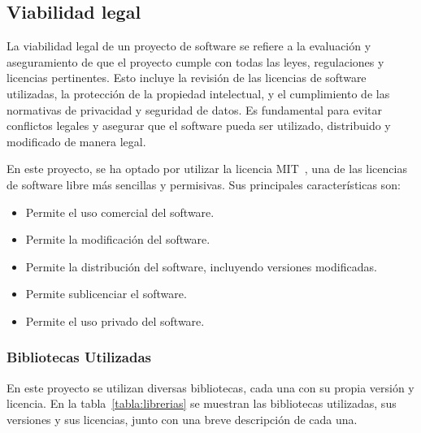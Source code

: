 \subsection{Viabilidad legal}
La viabilidad legal de un proyecto de software se refiere a la evaluación y aseguramiento de que el proyecto cumple con todas las leyes, regulaciones y licencias pertinentes. Esto incluye la revisión de las licencias de software utilizadas, la protección de la propiedad intelectual, y el cumplimiento de las normativas de privacidad y seguridad de datos. Es fundamental para evitar conflictos legales y asegurar que el software pueda ser utilizado, distribuido y modificado de manera legal.

En este proyecto, se ha optado por utilizar la licencia MIT~\cite{eswiki:MIT}, una de las licencias de software libre más sencillas y permisivas. Sus principales características son:

\begin{itemize}
    \item Permite el uso comercial del software.
    \item Permite la modificación del software.
    \item Permite la distribución del software, incluyendo versiones modificadas.
    \item Permite sublicenciar el software.
    \item Permite el uso privado del software.
\end{itemize}

\subsubsection{Bibliotecas Utilizadas}

En este proyecto se utilizan diversas bibliotecas, cada una con su propia versión y licencia. En la tabla~\ref{tabla:librerias} se muestran las bibliotecas utilizadas, sus versiones y sus licencias, junto con una breve descripción de cada una.


